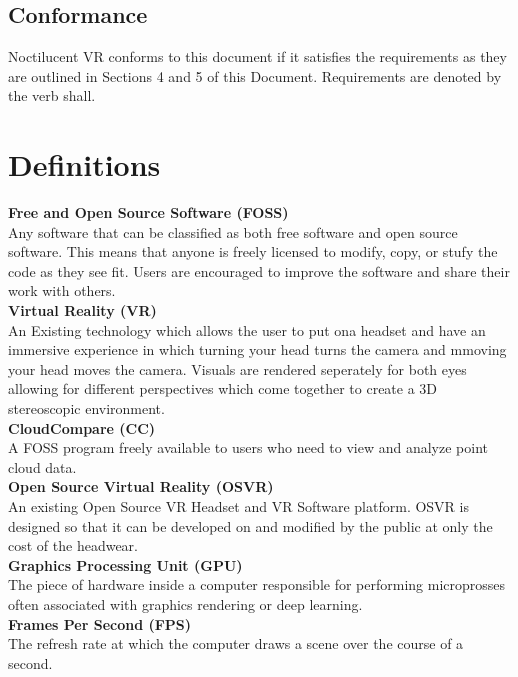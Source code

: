 \documentclass{article}
\begin{document}
\subsection{Conformance}

Noctilucent VR conforms to this document if it satisfies the requirements as they are outlined in Sections 4 and 5 of this Document. Requirements are denoted by the verb shall.

\section{Definitions}

{\parindent0pt
\textbf{Free and Open Source Software (FOSS)}\\

Any software that can be classified as both free software and open source software.
This means that anyone is freely licensed to modify, copy, or stufy the code as they see fit.
Users are encouraged to improve the software and share their work with others.\\

\textbf{Virtual Reality (VR)}\\

An Existing technology which allows the user to put ona headset and have an immersive experience in which turning your  head turns the camera and mmoving your head moves the camera.
Visuals are rendered seperately for both eyes allowing for different perspectives which come together to create a 3D stereoscopic environment.\\

\textbf{CloudCompare (CC)}\\

A FOSS program freely available to users who need to view and analyze point cloud data.\\

\textbf{Open Source Virtual Reality (OSVR)}\\

An existing Open Source VR Headset and VR Software platform.
OSVR is designed so that it can be developed on and modified by the public at only the cost of the headwear.\\

\textbf{Graphics Processing Unit (GPU)}\\

The piece of hardware inside a computer responsible for performing microprosses often associated with graphics rendering or deep learning.\\

\textbf{Frames Per Second (FPS)}\\

The refresh rate at which the computer draws a scene over the course of a second.\\
}
\end{document}

